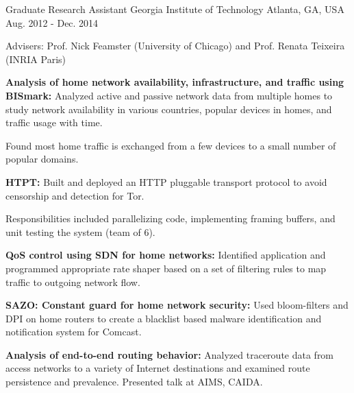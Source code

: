 \begin{cventries}
  \cventry
    {Graduate Research Assistant} %
    {Georgia Institute of Technology} %
    {Atlanta, GA, USA} %
    {Aug. 2012 - Dec. 2014} %
    {
      \begin{cvitems} %
      \item {Advisers: Prof. Nick Feamster (University of Chicago) and Prof. Renata Teixeira (INRIA Paris)}
%      
      \item {\textbf{Analysis of home network availability, infrastructure, and traffic using BISmark:} Analyzed active and passive network data from multiple homes to study network availability in various countries, popular devices in homes, and traffic usage with time.
      		}
      \item {Found most home traffic is exchanged from a few devices to a small number of popular domains.}
%      
      \item {\textbf{HTPT:} Built and deployed an HTTP pluggable transport protocol to avoid censorship and detection for Tor.
      		}
      \item {Responsibilities included parallelizing code, implementing framing buffers, and unit testing the system (team of 6).}
%      
      \item {\textbf{QoS control using SDN for home networks:} Identified application and programmed appropriate rate shaper based on a set of filtering rules to map traffic to outgoing network flow.
     		}
%     		
      \item {\textbf{SAZO: Constant guard for home network security:} Used bloom-filters and DPI on home routers to create a blacklist based malware identification and notification system for Comcast.
      		}
%      		
%      		
      \item {\textbf{Analysis of end-to-end routing behavior:} Analyzed traceroute data from access networks to a variety of Internet destinations and examined route persistence and prevalence. Presented talk at AIMS, CAIDA.}

\end{cvitems}}
\end{cventries}
